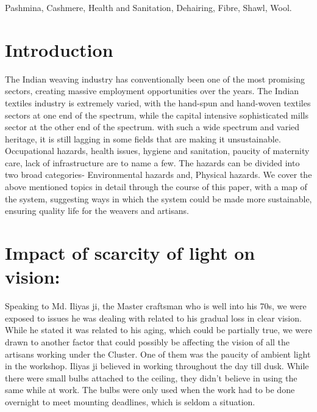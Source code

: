 \documentclass[journal]{IEEEtran}
\begin{document}

\begin{IEEEkeywords}
Pashmina, Cashmere, Health and Sanitation, Dehairing, Fibre, Shawl, Wool. 
\end{IEEEkeywords}






%
\IEEEpeerreviewmaketitle


\section{Introduction}
The Indian weaving industry has conventionally been one of the most promising sectors, creating massive employment opportunities over the years. The Indian textiles industry is extremely varied, with the hand-spun and hand-woven textiles sectors at one end of the spectrum, while the capital intensive sophisticated mills sector at the other end of the spectrum. with such a wide spectrum and varied heritage, it is still lagging in some fields that are making it unsustainable. Occupational hazards, health issues, hygiene and sanitation, paucity of maternity care, lack of infrastructure are to name a few. The hazards can be divided into two broad categories- Environmental hazards and, Physical hazards. We cover the above mentioned topics in detail through the course of this paper, with a map of the system, suggesting ways in which the system could be made more sustainable, ensuring quality life for the weavers and artisans. 


\section{Impact of scarcity of light on vision:}
Speaking to Md. Iliyas ji, the Master craftsman who is well into his 70s, we were exposed to issues he was dealing with related to his gradual loss in clear vision. While he stated it was related to his aging, which could be partially true, we were drawn to another factor that could possibly be affecting the vision of all the artisans working under the Cluster. One of them was the paucity of ambient light in the workshop. Iliyas ji believed in working throughout the day till dusk. While there were small bulbs attached to the ceiling, they didn’t believe in using the same while at work. The bulbs were only used when the work had to be done overnight to meet mounting deadlines, which is seldom a situation. 
\end{document}
